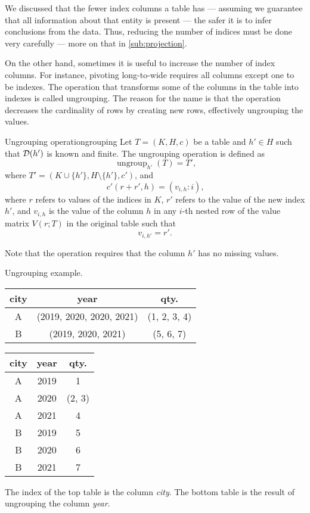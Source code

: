 We discussed that the fewer index columns a table has ---
assuming we guarantee that all information about that entity is present --- the safer
it is to infer conclusions from the data.  Thus, reducing the number of indices
must be done very carefully --- more on that in \cref{sub:projection}.

On the other hand, sometimes it is useful to increase the number of index columns.  For
instance, pivoting long-to-wide requires all columns except one to be indexes.  The
operation that transforms some of the columns in the table into indexes is called ungrouping.
The reason for the name is that the operation decreases the cardinality of rows
by creating new rows, effectively ungrouping the values.

\begin{defbox}{Ungrouping operation}{grouping}
  Let $T = (K, H, c)$ be a table and $h' \in H$ such that $\mathcal{D}\!\left(h'\right)$ is known and
  finite.  The ungrouping operation is defined as \[
    \operatorname{ungroup}_{h'}(T) = T'\text{,}
  \] where $T' = (K \cup \{h'\}, H \setminus \{h'\}, c')$, and \[
    c'(r + r', h) = (v_{i,h} : i)\text{,}
  \] where $r$ refers to values of the indices in $K$, $r'$ refers to the value of the new index
  $h'$, and $v_{i,h}$ is the value of the column $h$ in any $i$-th nested row of the value
  matrix $V(r; T)$ in the original table such that \[
    v_{i, h'} = r'\text{.}
  \]
\end{defbox}

Note that the operation requires that the column $h'$ has no missing values.

\begin{tablebox}[label=tab:ungroup]{Ungrouping example.}
  \centering
  \begin{tabular}{ccc}
    \toprule
    \textbf{city} & \textbf{year} & \textbf{qty.} \\
    \midrule
    A & (2019, 2020, 2020, 2021) & (1, 2, 3, 4) \\
    B & (2019, 2020, 2021) & (5, 6, 7) \\
    \bottomrule
  \end{tabular}

  \vspace{1em}
  \begin{tabular}{ccc}
    \toprule
    \textbf{city} & \textbf{year} & \textbf{qty.} \\
    \midrule
    A & 2019 & 1 \\
    A & 2020 & (2, 3) \\
    A & 2021 & 4 \\
    B & 2019 & 5 \\
    B & 2020 & 6 \\
    B & 2021 & 7 \\
    \bottomrule
  \end{tabular}
  \tcblower
  The index of the top table is the column \emph{city}.  The bottom table is the result of
  ungrouping the column \emph{year}.
\end{tablebox}

